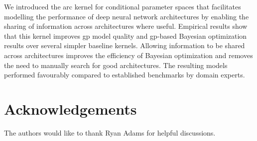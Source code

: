 \documentclass{article}
\newcommand{\gp}{{\sc gp}}
\begin{document}
We introduced the arc kernel for conditional parameter spaces that facilitates modelling the performance of deep neural network architectures by enabling the sharing of information across architectures where useful.
Empirical results show that this kernel improves \gp{} model quality and \gp{}-based Bayesian optimization results over several simpler baseline kernels. Allowing information to be shared across architectures improves the efficiency of Bayesian optimization and removes the need to manually search for good architectures. The resulting models performed favourably compared to established benchmarks by domain experts.

\section{Acknowledgements}
The authors would like to thank Ryan Adams for helpful discussions.



\end{document}
